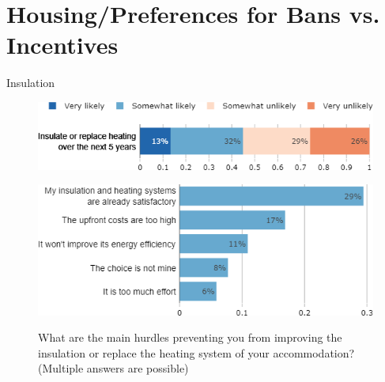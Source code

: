 \documentclass[aspectratio=169,9pt,dvipsnames]{beamer}
\begin{document}
\section{Housing/Preferences for Bans vs. Incentives}

\begin{frame}{Insulation}%
\vspace{-.5cm}
\begin{figure}[h!]
\caption{How likely is it that you will improve the insulation or replace the heating system of your accommodation over the next 5 years?}
\includegraphics[width=.6\textwidth]{../figures/DK/will_insulate_DK.png} \\
\vspace{.1cm}
\caption{What are the main hurdles preventing you from improving the insulation or replace the heating system of your accommodation? (Multiple answers are possible)}
\includegraphics[width=.54\textwidth]{../figures/DK/obstacles_insulation_DK.png}\\
\end{figure}
\end{frame}
\end{document}

